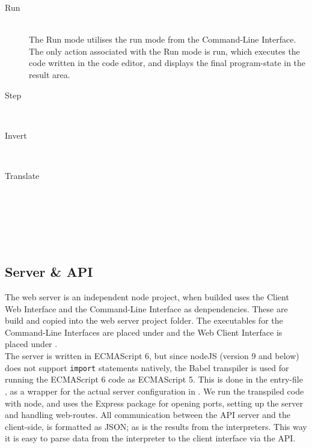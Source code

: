 \begin{description}

  \item[Run]~\\
    The Run mode utilises the run mode from the Command-Line Interface. The only action associated with the Run mode is  run, which executes the code written in the code editor, and displays the final program-state in the result area.

  \item[Step]~\\


  \item[Invert]~\\


  \item[Translate]~\\


\end{description}

\\
\\
\\

\subsection*{Server \& API}
%

The web server is an independent node project, when builded uses the Client Web Interface and the Command-Line Interface as denpendencies.
These are build and copied into the web server project folder.
The executables for the Command-Line Interfaces are placed under  and the Web Client Interface is placed under .\\

\noindent
The server is written in ECMAScript 6, but since nodeJS (version 9 and below) does not support \texttt{import} statements natively, the Babel transpiler is used for running the ECMAScript 6 code as ECMAScript 5.
This is done in the entry-file , as a wrapper for the actual server configuration in .
We run the transpiled code with node, and uses the Express package for opening ports, setting up the server and handling web-routes.
All communication between the API server and the client-side, is formatted as JSON; as is the results from the interpreters.
This way it is easy to parse data from the interpreter to the client interface via the API.


